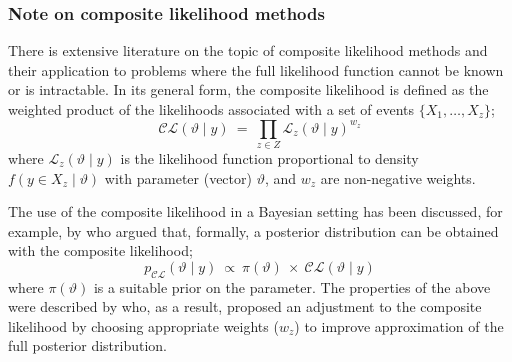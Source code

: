 %



%
\subsubsection{Note on composite likelihood methods}
%


There is extensive literature on the topic of composite likelihood methods and their application to problems where the full likelihood function cannot be known or is intractable.
In its general form, the composite likelihood is defined as the weighted product of the likelihoods associated with a set of events ${\{X_1,\ldots,X_z\}}$; \ie \citep{lindsay1988composite}
\begin{equation}\label{eq:simple_cl}
	\mathcal{C\!L}(\vartheta\mid y)~=~\prod_{z\in Z} \mathcal{L}_z(\vartheta\mid y)^{w_z}
\end{equation}
where ${\mathcal{L}_z(\vartheta\mid y)}$ is the likelihood function proportional to density ${f(y\in X_z \mid \vartheta)}$ with parameter (vector) $\vartheta$, and $w_z$ are non-negative weights.

The use of the composite likelihood in a Bayesian setting has been discussed, for example, by \citet{pauli2011bayesian} who argued that, formally, a posterior distribution can be obtained with the composite likelihood; \ie
\begin{equation}
	p_{\mathcal{C\!L}}(\vartheta\mid y)~\propto~\pi(\vartheta)~\times~\mathcal{C\!L}(\vartheta\mid y)
\end{equation}
where ${\pi(\vartheta)}$ is a suitable prior on the parameter.
The properties of the above were described by \citet{pauli2011bayesian} who, as a result, proposed an adjustment to the composite likelihood by choosing appropriate weights ($w_z$) to improve approximation of the full posterior distribution.

